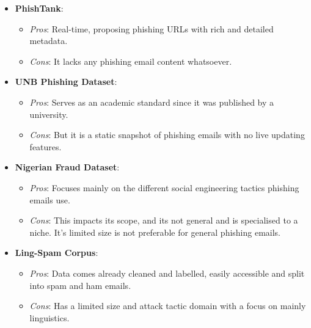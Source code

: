 \begin{itemize}
\begin{itemize}
  \end{itemize}
  \item \textbf{PhishTank}:
  \begin{itemize}
    \item \textit{Pros}: Real-time, proposing phishing URLs with rich and detailed metadata.
    \item \textit{Cons}: It lacks any phishing email content whatsoever.
  \end{itemize}
  \item \textbf{UNB Phishing Dataset}:
  \begin{itemize}
    \item \textit{Pros}: Serves as an academic standard since it was published by a university.
    \item \textit{Cons}: But it is a static snapshot of phishing emails with no live updating features.
  \end{itemize}
  \item \textbf{Nigerian Fraud Dataset}:
  \begin{itemize}
    \item \textit{Pros}: Focuses mainly on the different social engineering tactics phishing emails use.
    \item \textit{Cons}: This impacts its scope, and its not general and is specialised to a niche. It's limited size is not preferable for general phishing emails.
  \end{itemize}
  \item \textbf{Ling-Spam Corpus}:
  \begin{itemize}
    \item \textit{Pros}: Data comes already cleaned and labelled, easily accessible and split into spam and ham emails.
    \item \textit{Cons}: Has a limited size and attack tactic domain with a focus on mainly linguistics.
  \end{itemize}
\end{itemize}
